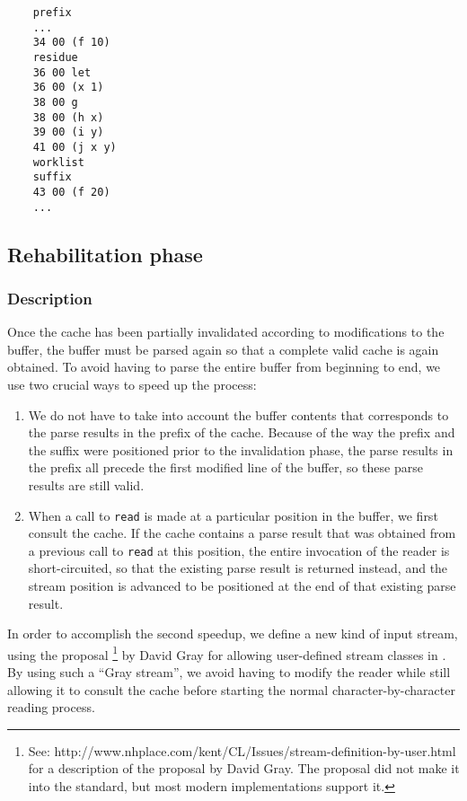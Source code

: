 {\small\begin{verbatim}
    prefix
    ...
    34 00 (f 10)
    residue
    36 00 let
    36 00 (x 1)
    38 00 g
    38 00 (h x)
    39 00 (i y)
    41 00 (j x y)
    worklist
    suffix
    43 00 (f 20)
    ...
\end{verbatim}}

\subsection{Rehabilitation phase}

\subsubsection{Description}

Once the cache has been partially invalidated according to
modifications to the buffer, the buffer must be parsed again so that a
complete valid cache is again obtained.  To avoid having to parse the
entire buffer from beginning to end, we use two crucial ways to speed
up the process:

\begin{enumerate}
\item We do not have to take into account the buffer contents that
  corresponds to the parse results in the prefix of the cache.
  Because of the way the prefix and the suffix were positioned prior
  to the invalidation phase, the parse results in the prefix all
  precede the first modified line of the buffer, so these parse
  results are still valid.
\item When a call to \texttt{read} is made at a particular position in
  the buffer, we first consult the cache.  If the cache contains a
  parse result that was obtained from a previous call to \texttt{read}
  at this position, the entire invocation of the reader is
  short-circuited, so that the existing parse result is returned
  instead, and the stream position is advanced to be positioned at the
  end of that existing parse result.
\end{enumerate}

In order to accomplish the second speedup, we define a new kind of
input stream, using the proposal%
\footnote{See:
  http://www.nhplace.com/kent/CL/Issues/stream-definition-by-user.html
  for a description of the proposal by David Gray.  The proposal did
  not make it into the \commonlisp{} standard, but most modern
  implementations support it.}
 by David Gray for allowing user-defined stream classes in
 \commonlisp{}.  By using such a ``Gray stream'', we avoid having to
 modify the reader while still allowing it to consult the cache before
 starting the normal character-by-character reading process.

